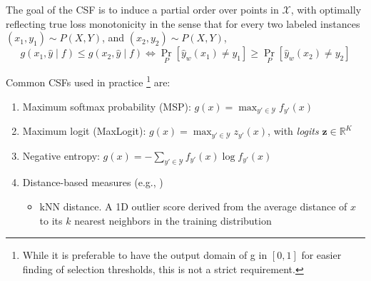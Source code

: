 The goal of the CSF is to induce a partial order over points in $\mathcal{X}$, with optimally reflecting true loss monotonicity in the sense that for every two labeled instances $\left(x_1, y_1\right) \sim P(X, Y)$, and $\left(x_2, y_2\right) \sim P(X, Y)$,
$$
    g\left(x_1, \hat{y} \mid f\right) \leq g\left(x_2, \hat{y} \mid f\right) \Longleftrightarrow \operatorname{Pr}_P\left[\hat{y}_w\left(x_1\right) \neq y_1\right] \geq \operatorname{Pr}_P\left[\hat{y}_w\left(x_2\right) \neq y_2\right]
$$

\noindent Common CSFs used in practice \footnote{While it is preferable to have the output domain of g in $[0,1]$ for easier finding of selection thresholds, this is not a strict requirement.} are:
\begin{enumerate}
    \item Maximum softmax probability (MSP): $g(x) = \max_{y' \in \mathcal{Y}} f_{y'}(x)$
    \item Maximum logit (MaxLogit): $g(x) = \max_{y' \in \mathcal{Y}} z_{y'}(x)$, with \textit{logits} $\mathbf{z} \in \mathbb{R}^K$
    \item Negative entropy: $g(x) = -\sum_{y' \in \mathcal{Y}} f_{y'}(x) \log f_{y'}(x)$
    \item Distance-based measures (e.g., \cite{fisch2022calibrated})
          \begin{itemize}
              \item kNN distance. A 1D outlier score derived from the average distance of $x$ to its $k$ nearest neighbors in the training distribution
          \end{itemize}
\end{enumerate}

